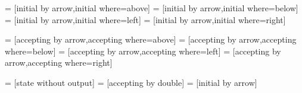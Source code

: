 \def\tikz@initial@text{start}
\def\tikz@accepting@text{}

\def\tikz@initial@distance{3ex}
\def\tikz@accepting@distance{3ex}

\def\tikz@initial@compute@above{\def\tikz@initial@angle{90}\def\tikz@initial@anchor{south}}
\def\tikz@initial@compute@below{\def\tikz@initial@angle{270}\def\tikz@initial@anchor{north}}
\def\tikz@initial@compute@left{\def\tikz@initial@angle{180}\def\tikz@initial@anchor{east}}
\def\tikz@initial@compute@right{\def\tikz@initial@angle{0}\def\tikz@initial@anchor{west}}

\def\tikz@initial@angle{180}
\def\tikz@initial@anchor{east}

\def\tikz@accepting@compute@above{\def\tikz@accepting@angle{90}\def\tikz@accepting@anchor{south}}
\def\tikz@accepting@compute@below{\def\tikz@accepting@angle{270}\def\tikz@accepting@anchor{north}}
\def\tikz@accepting@compute@left{\def\tikz@accepting@angle{180}\def\tikz@accepting@anchor{east}}
\def\tikz@accepting@compute@right{\def\tikz@accepting@angle{0}\def\tikz@accepting@anchor{west}}

\def\tikz@accepting@angle{0}
\def\tikz@accepting@anchor{west}


=        [initial by arrow,initial where=above]
=        [initial by arrow,initial where=below]
=         [initial by arrow,initial where=left]
=        [initial by arrow,initial where=right]

=      [accepting by arrow,accepting where=above]
=      [accepting by arrow,accepting where=below]
=       [accepting by arrow,accepting where=left]
=      [accepting by arrow,accepting where=right]



=                [state without output]
=            [accepting by double]
=              [initial by arrow]



\endinput
